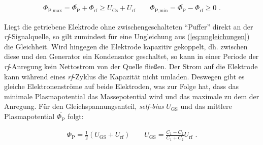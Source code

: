 \documentclass[numbers=noenddot,a4paper,notitlepage,twoside,BCOR15mm]{scrbook}
\newcommand{\ix}[1]{_\text{#1}}
\newcommand{\tilt}[1]{\textit{#1}}
\begin{document}
						\begin{align}
							\Phi\ix{P,max}=\overline{\Phi\ix{P}}+\Phi\ix{rf}\geq U\ix{Gs}+U\ix{rf} \quad \quad \Phi\ix{P,min}=\overline{\Phi\ix{P}}-\Phi\ix{rf}\geq 0\, \, . \label{eq:ungleichungen}
						\end{align}

					Liegt die getriebene Elektrode ohne zwischengeschalteten ``Puffer'' direkt an der \tilt{rf}-Signalquelle, so gilt zumindest f\"ur eine Ungleichung aus (\ref{eq:ungleichungen}) die Gleichheit. Wird hingegen die Elektrode kapazitiv gekoppelt, dh. zwischen diese und den Generator ein Kondensator geschaltet, so kann in einer Periode der \tilt{rf}-Anregung kein Nettostrom von der Quelle flie{\ss}en. Der Strom auf die Elektrode kann während eines \tilt{rf}-Zyklus die Kapazität nicht umladen. Deswegen gibt es gleiche Elektronenstr\"ome auf beide Elektroden, was zur Folge hat, dass das minimale Plasmapotential das Massepotential wird und das maximale zu dem der Anregung. F\"ur den Gleichspannungsanteil, \tilt{self-bias} $U\ix{GS}$ und das mittlere Plasmapotential $\overline{\Phi\ix{P}}$ folgt:

						\begin{align}
							\overline{\Phi\ix{P}}=\frac{1}{2}\left(U\ix{GS}+U\ix{rf}\right) \quad \quad U\ix{GS}=\frac{C\ix{1}-C\ix{2}}{C\ix{1}+C\ix{2}}U\ix{rf} \,\, .\label{eq:selfbiaszwei} 
						\end{align}
\end{document}
